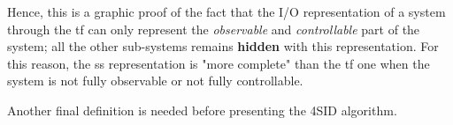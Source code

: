 \begin{rem}
\begin{figure}[H]
    \end{figure}
    
    \vspace{-15pt}
    
    Hence, this is a graphic proof of the fact that the I/O representation of a system through the \acrlong{tf} can only represent the \emph{observable} and \emph{controllable} part of the system; all the other sub-systems remains \textbf{hidden} with this representation. For this reason, the \gls{ss} representation is "more complete" than the \gls{tf} one when the system is not fully observable or not fully controllable.
\end{rem}

Another final definition is needed before presenting the 4SID algorithm.

